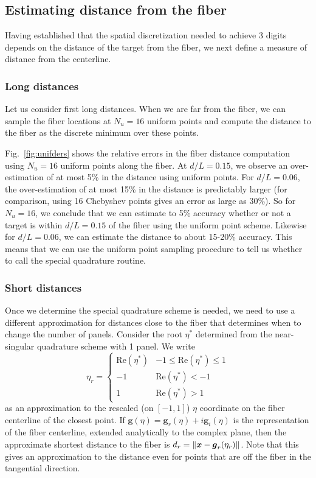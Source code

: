 \subsection{Estimating distance from the fiber}
Having established that the spatial discretization needed to achieve 3 digits depends on the distance of the target from the fiber, we next define a measure of distance from the centerline. 

\subsubsection{Long distances}
Let us consider first long distances. When we are far from the fiber, we can sample the fiber locations at $N_u=16$ uniform points and compute the distance to the fiber as the discrete minimum over these points. 

Fig.\ \ref{fig:unifders} shows the relative errors in the fiber distance computation using $N_u=16$ uniform points along the fiber. At $d/L = 0.15$, we observe an over-estimation of at most 5\% in the distance using uniform points. For $d/L=0.06$, the over-estimation of at most 15\% in the distance is predictably larger (for comparison, using 16 Chebyshev points gives an error as large as 30\%). So for $N_u=16$, we conclude that we can estimate to 5\% accuracy whether or not a target is within $d/L=0.15$ of the fiber using the uniform point scheme. Likewise for $d/L=0.06$, we can estimate the distance to about 15-20\% accuracy. This means that we can use the uniform point sampling procedure to tell us whether to call the special quadrature routine. 

\subsubsection{Short distances}
Once we determine the special quadrature scheme is needed, we need to use a different approximation for distances close to the fiber that determines when to change the number of panels. Consider the root $\eta^*$ determined from the near-singular quadrature scheme with 1 panel. We write 
\begin{equation}
\label{eq:eta}
\eta_r=\begin{cases} \text{Re}(\eta^*) & -1 \leq \text{Re}(\eta^*) \leq 1\\[2 pt] -1 & \text{Re}(\eta^*) < -1 \\[2 pt]1 &  \text{Re}(\eta^*) > 1 \end{cases}
\end{equation} 
as an approximation to the rescaled (on $[-1,1]$) $\eta$ coordinate on the fiber centerline of the closest point. If $\bm{g}(\eta)=\bm{g}_r(\eta)+i\bm{g}_i(\eta)$ is the representation of the fiber centerline, extended analytically to the complex plane, then the approximate shortest distance to the fiber is $d_r=\left\Vert \boldsymbol{x}-\boldsymbol{g}_r(\eta_r)\right\Vert$. Note that this gives an approximation to the distance even for points that are off the fiber in the tangential direction. 

